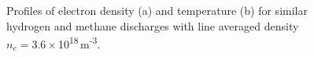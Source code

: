 \documentclass[%
 aip,
 amsmath,amssymb,
 reprint,%
]{revtex4-1}
\begin{document}
\begin{figure}[!htbp]
\centering
\begin{subfigure}[]{.49\textwidth}
  \centering
\end{subfigure}
\hfill
\begin{subfigure}[]{.49\textwidth}
  \centering
\end{subfigure}
\caption{Profiles of electron density (a) and temperature (b) for similar hydrogen and methane discharges with line averaged density $n_e=3.6\times$10\textsuperscript{18}\,m\textsuperscript{-3}.}
\label{fig:h2_vs_ch4_profiles}
\end{figure}
\end{document}
